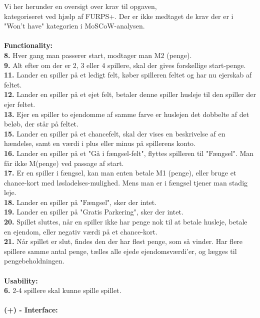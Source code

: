 \noindent Vi her herunder en oversigt over krav til opgaven, \\ kategoriseret ved hjælp af FURPS+. Der er ikke medtaget de krav der er i "Won't have" kategorien i MoSCoW-analysen.
\\\\\textbf{Functionality:}\\
    \textbf{8.} Hver gang man passerer start, modtager man M2 (penge). 
    \\
    \textbf{9.} Alt efter om der er 2, 3 eller 4 spillere, skal der gives forskellige start-penge. 
    \\
    \textbf{11.} Lander en spiller på et ledigt felt, køber spilleren feltet og har nu ejerskab af feltet. 
    \\
    \textbf{12.} Lander en spiller på et ejet felt, betaler denne spiller husleje til den spiller der ejer feltet. 
    \\
    \textbf{13.} Ejer en spiller to ejendomme af samme farve er huslejen det dobbelte af det beløb, der står på feltet. 
    \\
    \textbf{15.} Lander en spiller på et chancefelt, skal der vises en beskrivelse af en hændelse, samt en værdi i plus eller minus på spillerens konto. 
    \\
    \textbf{16.}
    Lander en spiller på et "Gå i fængsel-felt", flyttes spilleren til "Fængsel". Man får ikke M(penge) ved passage af start. 
    \\
    \textbf{17.}
    Er en spiller i fængsel, kan man enten betale M1 (penge), eller bruge et chance-kort med løsladelses-mulighed. Mens man er i fængsel tjener man stadig leje. 
    \\
    \textbf{18.} Lander en spiller på "Fængsel", sker der intet. 
    \\
    \textbf{19.} Lander en spiller på "Gratis Parkering", sker der intet. 
    \\
    \textbf{20.} Spillet sluttes, når en spiller ikke har penge nok til at betale husleje, betale en ejendom, eller negativ værdi på et chance-kort. \\
    \textbf{21.} Når spillet er slut, findes den der har flest penge, som så vinder. Har flere spillere samme antal penge, tælles alle ejede ejendomsværdi’er, og lægges til pengebeholdningen.
\\\\\textbf{Usability:}\\
    \textbf{6.} 2-4 spillere skal kunne spille spillet.
\\\\\textbf{(+) - Interface:}\\

